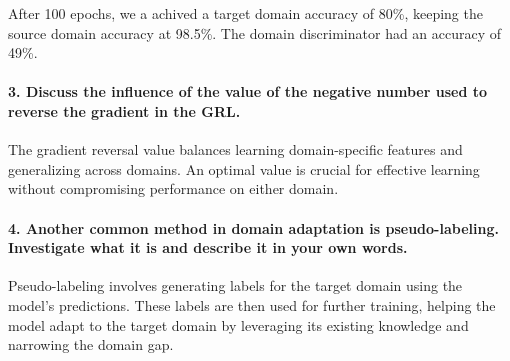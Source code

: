 After 100 epochs, we a achived a target domain accuracy of 80\%, keeping the source domain accuracy at 98.5\%. The domain discriminator had an accuracy of 49\%.

\paragraph*{3. Discuss the influence of the value of the negative number used to reverse the gradient in the GRL.}

The gradient reversal value balances learning domain-specific features and generalizing across domains. An optimal value is crucial for effective learning without compromising performance on either domain.

\paragraph*{4. Another common method in domain adaptation is pseudo-labeling. Investigate what it is and describe it in your own words.}

Pseudo-labeling involves generating labels for the target domain using the model's predictions. These labels are then used for further training, helping the model adapt to the target domain by leveraging its existing knowledge and narrowing the domain gap.


